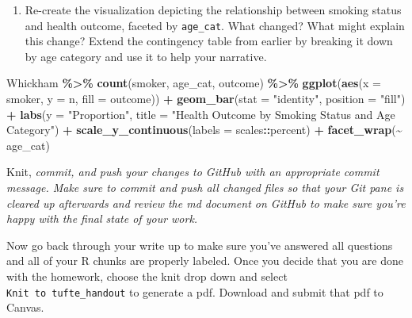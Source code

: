 \documentclass[
]{article}
\newenvironment{Shaded}{\begin{snugshade}}{\end{snugshade}}
\newcommand{\AttributeTok}[1]{\textcolor[rgb]{0.13,0.29,0.53}{#1}}
\newcommand{\FunctionTok}[1]{\textcolor[rgb]{0.13,0.29,0.53}{\textbf{#1}}}
\newcommand{\NormalTok}[1]{#1}
\newcommand{\SpecialCharTok}[1]{\textcolor[rgb]{0.81,0.36,0.00}{\textbf{#1}}}
\newcommand{\StringTok}[1]{\textcolor[rgb]{0.31,0.60,0.02}{#1}}
\providecommand{\tightlist}{%
  \setlength{\itemsep}{0pt}\setlength{\parskip}{0pt}}
\begin{document}
\begin{enumerate}
\def\labelenumi{\arabic{enumi}.}
\setcounter{enumi}{6}
\tightlist
\item
  Re-create the visualization depicting the relationship between smoking
  status and health outcome, faceted by \texttt{age\_cat}. What changed?
  What might explain this change? Extend the contingency table from
  earlier by breaking it down by age category and use it to help your
  narrative.
\end{enumerate}

\begin{Shaded}
\begin{Highlighting}[]
\NormalTok{Whickham }\SpecialCharTok{\%\textgreater{}\%}
  \FunctionTok{count}\NormalTok{(smoker, age\_cat, outcome) }\SpecialCharTok{\%\textgreater{}\%}
  \FunctionTok{ggplot}\NormalTok{(}\FunctionTok{aes}\NormalTok{(}\AttributeTok{x =}\NormalTok{ smoker, }\AttributeTok{y =}\NormalTok{ n, }\AttributeTok{fill =}\NormalTok{ outcome)) }\SpecialCharTok{+}
  \FunctionTok{geom\_bar}\NormalTok{(}\AttributeTok{stat =} \StringTok{"identity"}\NormalTok{, }\AttributeTok{position =} \StringTok{"fill"}\NormalTok{) }\SpecialCharTok{+}
  \FunctionTok{labs}\NormalTok{(}\AttributeTok{y =} \StringTok{"Proportion"}\NormalTok{, }\AttributeTok{title =} \StringTok{"Health Outcome by Smoking Status and Age Category"}\NormalTok{) }\SpecialCharTok{+}
  \FunctionTok{scale\_y\_continuous}\NormalTok{(}\AttributeTok{labels =}\NormalTok{ scales}\SpecialCharTok{::}\NormalTok{percent) }\SpecialCharTok{+}
  \FunctionTok{facet\_wrap}\NormalTok{(}\SpecialCharTok{\textasciitilde{}}\NormalTok{ age\_cat)}
\end{Highlighting}
\end{Shaded}

Knit, \emph{commit, and push your changes to GitHub with an appropriate
commit message. Make sure to commit and push all changed files so that
your Git pane is cleared up afterwards and review the md document on
GitHub to make sure you're happy with the final state of your work.}

Now go back through your write up to make sure you've answered all
questions and all of your R chunks are properly labeled. Once you decide
that you are done with the homework, choose the knit drop down and
select \texttt{Knit\ to\ tufte\_handout} to generate a pdf. Download and
submit that pdf to Canvas.
\end{document}
